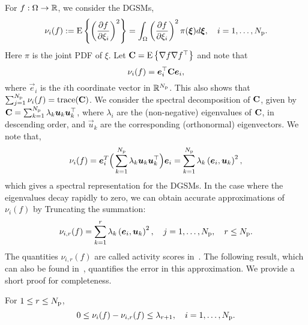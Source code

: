 For $f: \Omega \to \mathbb{R}$, we consider the DGSMs,
\[
    \nu_i(f) := \E{\left(\frac{\partial f}{\partial\xi_i}\right)^2} =
                  \int_\Omega 
                  \left(\frac{\partial f}{\partial\xi_i}\right)^2
                  \pi(\vec{\xi})d\vec{\xi}, \quad i = 1, \ldots, \Np.   
\]
Here $\pi$ is the joint PDF of $\xi$. 
Let $\mathbf{{C}} = \mathrm{E}\left\{{\nabla f \nabla f^\top} \right\}$ and note that
\[
   \nu_i(f) = \vec{e}_i^\top \mat{C} \vec{e}_i, 
\]
where $\vec{e}_i$ is the $i$th coordinate vector in $\mathbb{R}^{N_\text{p}}$.
This also shows that $\sum_{j=1}^{N_\text{p}} \nu_i(f) = \mathrm{trace}(\mathbf{{C}})$.
We consider the spectral decomposition of $\mathbf{{C}}$, given by  
$\mat{C} = \sum_{k=1}^\Np \lambda_k \vec{u}_k \vec{u}_k^\top$, where 
$\lambda_i$ are the (non-negative) eigenvalues of $\mathbf{{C}}$, in descending
order, and
$\vec{u}_k$ are the corresponding (orthonormal) eigenvectors.
We note that,
\begin{equation}\label{equ:spectral_DGSM}
\nu_i(f) = \vec{e}_i^T \Big(\sum_{k=1}^\Np \lambda_k \vec{u}_k \vec{u}_k^\top\Big) \vec{e}_i
 = \sum_{k=1}^\Np \lambda_k \ip{\vec{e}_i}{\vec{u}_k}^2, 
\end{equation}
which gives a spectral representation for the DGSMs. 
In the case where the eigenvalues decay rapidly to zero, we can obtain
accurate approximations of $\nu_i(f)$ by Truncating the summation: 
\newcommand{\act}[3]{\nu_{{#2},{#3}}({#1})}
\newcommand{\actt}[3]{\tilde{\nu}_{{#2},{#3}}({#1})}
\[
   \act{f}{i}{r} =  \sum_{k=1}^r \lambda_k \ip{\vec{e}_i}{\vec{u}_k}^2,
   \quad j = 1, \ldots, \Np, \quad r \leq \Np.
\]
The quantities $\act{f}{i}{r}$ are called activity scores
in~\cite{Diaz:2016,Constantine:2017}.
The following result, which
can also be found in~\cite{Diaz:2016,Constantine:2017}, quantifies the error in this
approximation. We provide a short proof for completeness. 
\begin{proposition}\label{prp:dgsm_bound} 
For $1 \leq r \leq {N_\text{p}}$,
\[
0 \leq \nu_i(f) - \act{f}{i}{r} \leq \lambda_{r+1}, \quad i = 1, \ldots, \Np.
\] 
\end{proposition}

